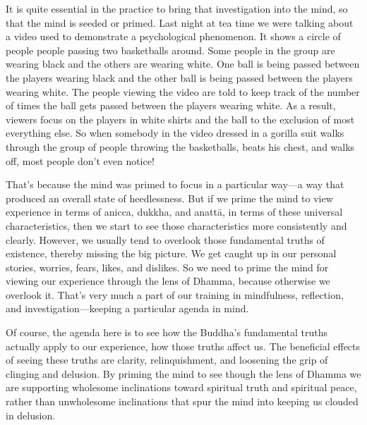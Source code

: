 It is quite essential in the practice to bring that investigation into 
the mind, so that the mind is seeded or primed. Last night at tea time 
we were talking about a video used to demonstrate a psychological 
phenomenon. It shows a circle of people people passing two basketballs 
around. Some people in the group are wearing black and the others are 
wearing white. One ball is being passed between the players wearing 
black and the other ball is being passed between the players wearing 
white. The people viewing the video are told to keep track of the 
number of times the ball gets passed between the players wearing white. 
As a result, viewers focus on the players in white shirts and the ball 
to the exclusion of most everything else. So when somebody in the video 
dressed in a gorilla suit walks through the group of people throwing 
the basketballs, beats his chest, and walks off, most people don't even 
notice!

That's because the mind was primed to focus in a particular way---a way 
that produced an overall state of heedlessness. But if we prime the 
mind to view experience in terms of anicca, dukkha, and anattā, in 
terms of these universal characteristics, then we start to see those 
characteristics more consistently and clearly. However, we usually tend 
to overlook those fundamental truths of existence, thereby missing the 
big picture. We get caught up in our personal stories, worries, fears, 
likes, and dislikes. So we need to prime the mind for viewing our 
experience through the lens of Dhamma, because otherwise we overlook 
it. That's very much a part of our training in mindfulness, reflection, 
and investigation---keeping a particular agenda in mind.

Of course, the agenda here is to see how the Buddha's fundamental 
truths actually apply to our experience, how those truths affect us. 
The beneficial effects of seeing these truths are clarity, 
relinquishment, and loosening the grip of clinging and delusion. By 
priming the mind to see though the lens of Dhamma we are supporting 
wholesome inclinations toward spiritual truth and spiritual peace, 
rather than unwholesome inclinations that spur the mind into keeping us 
clouded in delusion.


